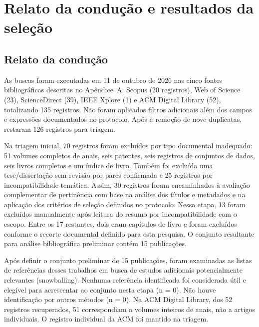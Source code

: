 \chapter{Relato da condução e resultados da seleção}
\label{ap:resultados}

\section{Relato da condução}

As buscas foram executadas em 11 de outubro de 2026 nas cinco fontes bibliográficas descritas no Apêndice~A: Scopus (20 registros), Web of Science (23), ScienceDirect (39), IEEE Xplore (1) e ACM Digital Library (52), totalizando 135 registros. Não foram aplicados filtros adicionais além dos campos e expressões documentados no protocolo. Após a remoção de nove duplicatas, restaram 126 registros para triagem.

Na triagem inicial, 70 registros foram excluídos por tipo documental inadequado: 51 volumes completos de anais, seis patentes, seis registros de conjuntos de dados, seis livros completos e um índice de livro. Também foi excluída uma tese/dissertação sem revisão por pares confirmada e 25 registros por incompatibilidade temática. Assim, 30 registros foram encaminhados à avaliação complementar de pertinência com base na análise dos títulos e metadados e na aplicação dos critérios de seleção definidos no protocolo. Nessa etapa, 13 foram excluídos manualmente após leitura do resumo por incompatibilidade com o escopo. Entre os 17 restantes, dois eram capítulos de livro e foram excluídos conforme o recorte documental definido para esta pesquisa. O conjunto resultante para análise bibliográfica preliminar contém 15 publicações.

Após definir o conjunto preliminar de 15 publicações, foram examinadas as listas de referências desses trabalhos em busca de estudos adicionais potencialmente relevantes (snowballing). Nenhuma referência identificada foi considerada útil e elegível para acrescentar ao conjunto nesta etapa (n = 0). Não houve identificação por outros métodos (n = 0). Na ACM Digital Library, dos 52 registros recuperados, 51 correspondiam a volumes inteiros de anais, não a artigos individuais. O registro individual da ACM foi mantido na triagem.

